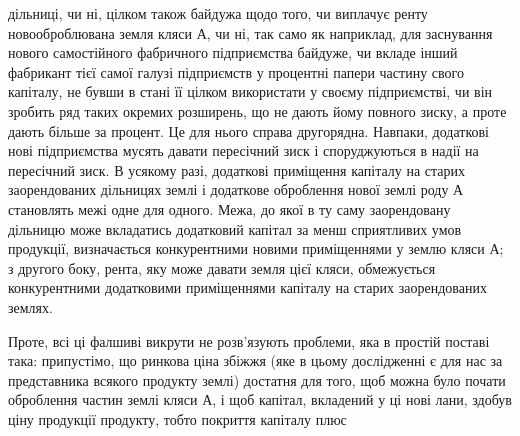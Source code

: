 дільниці, чи ні, цілком також байдужа щодо того, чи виплачує ренту новооброблювана
земля кляси А, чи ні, так само як наприклад, для заснування нового самостійного
фабричного підприємства байдуже, чи вкладе інший фабрикант тієї
самої галузі підприємств у процентні папери частину свого капіталу, не бувши в
стані її цілком використати у своєму підприємстві, чи він зробить ряд таких окремих
розширень, що не дають йому повного зиску, а проте дають більше за процент.
Це для нього справа другорядна. Навпаки, додаткові нові підприємства мусять
давати пересічний зиск і споруджуються в надії на пересічний зиск. В усякому
разі, додаткові приміщення капіталу на старих заорендованих дільницях
землі і додаткове оброблення нової землі роду А становлять межі одне для одного.
Межа, до якої в ту саму заорендовану дільницю може вкладатись додатковий
капітал за менш сприятливих умов продукції, визначається конкурентними
новими приміщеннями у землю кляси А; з другого боку, рента, яку
може давати земля цієї кляси, обмежується конкурентними додатковими приміщеннями
капіталу на старих заорендованих землях.

Проте, всі ці фалшиві викрути не розв’язують проблеми, яка в простій
поставі така: припустімо, що ринкова ціна збіжжя (яке в цьому дослідженні
є для нас за представника всякого продукту землі) достатня для того, щоб
можна було почати оброблення частин землі кляси А, і щоб капітал, вкладений
у ці нові лани, здобув ціну продукції продукту, тобто покриття капіталу плюс
\parbreak{}  %

